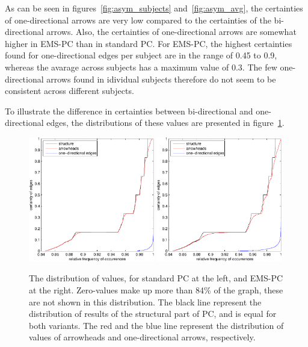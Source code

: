 \documentclass[a4paper, english]{article}
\begin{document}
As can be seen in figures~\ref{fig:asym_subjects} and~\ref{fig:asym_avg}, the certainties of one-directional arrows are very low compared to the certainties of the bi-directional arrows. Also, the certainties of one-directional arrows are somewhat higher in EMS-PC than in standard PC.
For EMS-PC, the highest certainties found for one-directional edges per subject are in the range of 0.45 to 0.9, whereas the avarage across subjects has a maximum value of 0.3.
The few one-directional arrows found in idividual subjects therefore do not seem to be consistent across different subjects.

To illustrate the difference in certainties between bi-directional and one-directional edges, the distributions of these values are presented in figure~\ref{fig:distributions}.
\begin{figure}[h!]
  \centering
  \includegraphics[width=0.49\textwidth]{images/new/dist_all_mod_legend-crop}
  \includegraphics[width=0.49\textwidth]{images/new/dist_all_expl_legend-crop}
  \caption{The distribution of values, for standard PC at the left, and EMS-PC at the right. Zero-values make up more than 84\% of the graph, these are not shown in this distribution. The black line represent the distribution of results of the structural part of PC, and is equal for both variants. The red and the blue line represent the distribution of values of arrowheads and one-directional arrows, respectively.}
  \label{fig:distributions}
\end{figure}
\end{document}
